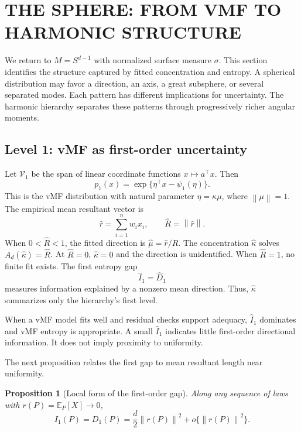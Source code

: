 \documentclass[twoside]{article}
\newtheorem{proposition}[theorem]{Proposition}
\theoremstyle{definition}
\theoremstyle{remark}
\newcommand{\V}{\mathcal V}
\newcommand{\E}{\mathbb E}
\newcommand{\norm}[1]{\left\lVert #1\right\rVert}
\begin{document}
\section{THE SPHERE: FROM VMF TO HARMONIC STRUCTURE}\label{sec:sphere}

We return to $M=S^{d-1}$ with normalized surface measure $\sigma$. This section identifies the structure captured by fitted concentration and entropy. A spherical distribution may favor a direction, an axis, a great subsphere, or several separated modes. Each pattern has different implications for uncertainty. The harmonic hierarchy separates these patterns through progressively richer angular moments.


\subsection{Level 1: vMF as first-order uncertainty}

Let $\V_1$ be the span of linear coordinate functions $x\mapsto a^\top x$.  Then
\[
  p_1(x)=\exp\{\eta^\top x-\psi_1(\eta)\}.
\]
This is the vMF distribution with natural parameter $\eta=\kappa\mu$, where $\norm{\mu}=1$. The empirical mean resultant vector is
\[
  \widehat r=\sum_{i=1}^n w_ix_i,
  \qquad \widehat R=\norm{\widehat r}.
\]
When $0<\widehat R<1$, the fitted direction is $\widehat\mu=\widehat r/\widehat R$. The concentration $\widehat\kappa$ solves $A_d(\widehat\kappa)=\widehat R$. At $\widehat R=0$, $\widehat\kappa=0$ and the direction is unidentified. When $\widehat R=1$, no finite fit exists. The first entropy gap
\[
  \widehat I_1=\widehat D_1
\]
measures information explained by a nonzero mean direction. Thus, $\widehat\kappa$ summarizes only the hierarchy's first level.

When a vMF model fits well and residual checks support adequacy, $\widehat I_1$ dominates and vMF entropy is appropriate. A small $\widehat I_1$ indicates little first-order directional information. It does not imply proximity to uniformity.



The next proposition relates the first gap to mean resultant length near uniformity.
\begin{proposition}[Local form of the first-order gap]
\label{prop:I1_local}
Along any sequence of laws with $r(P)=\E_P[X]\to0$,
\[
  I_1(P)=D_1(P)=\frac d2\norm{r(P)}^2+o\{\norm{r(P)}^2\}.
\]
\end{proposition}
\end{document}
